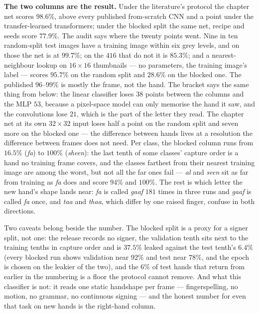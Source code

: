 \noindent \textbf{The two columns are the result.} Under the literature's
protocol the chapter net scores $98.6\%$, above every published
from-scratch CNN and a point under the transfer-learned transformers; under
the blocked split the same net, recipe and seeds score $77.9\%$. The audit
says where the twenty points went. Nine in ten random-split test images
have a training image within six grey levels, and on those the net is at
$99.7\%$; on the $416$ that do not it is $85.3\%$; and a nearest-neighbour
lookup on $16\times16$ thumbnails --- no parameters, the training image's
label --- scores $95.7\%$ on the random split and $28.6\%$ on the blocked
one. The published $96$--$99\%$ is mostly the frame, not the hand. The
bracket says the same thing from below: the linear classifier loses $38$
points between the columns and the MLP $53$, because a pixel-space model
can only memorise the hand it saw, and the convolutions lose $21$, which is
the part of the letter they read. The chapter net at its own $32\times32$
input loses half a point on the random split and seven more on the blocked
one --- the difference between hands lives at a resolution the difference
between frames does not need. Per class, the blocked column runs from
$16.5\%$ (\emph{fa}) to $100\%$ (\emph{sheen}): the last tenth of some
classes' capture order is a hand no training frame covers, and the classes
farthest from their nearest training image are among the worst, but not
all the far ones fail --- \emph{al} and \emph{seen} sit as far from
training as \emph{fa} does and score $94\%$ and $100\%$. The rest is which
letter the new hand's shape lands near: \emph{fa} is called \emph{gaaf}
$181$ times in three runs and \emph{gaaf} is called \emph{fa} once, and
\emph{taa} and \emph{thaa}, which differ by one raised finger, confuse in
both directions.

\medskip\noindent Two caveats belong beside the number. The blocked split
is a proxy for a signer split, not one: the release records no signer, the
validation tenth sits next to the training tenths in capture order and is
$37.5\%$ leaked against the test tenth's $6.4\%$ (every blocked run shows
validation near $92\%$ and test near $78\%$, and the epoch is chosen on the
leakier of the two), and the $6\%$ of test hands that return from earlier
in the numbering is a floor the protocol cannot remove. And what this
classifier is not: it reads one static handshape per frame ---
fingerspelling, no motion, no grammar, no continuous signing --- and the
honest number for even that task on new hands is the right-hand column.

